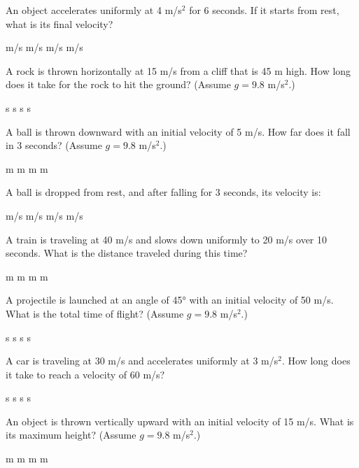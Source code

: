 \documentclass[addpoints]{exam}
\begin{document}
\begin{questions}
\question[1] An object accelerates uniformly at 4 m/s$^2$ for 6 seconds. If it starts from rest, what is its final velocity?
\begin{choices}
     m/s
     m/s
     m/s
     m/s
\end{choices}

\question[1] A rock is thrown horizontally at 15 m/s from a cliff that is 45 m high. How long does it take for the rock to hit the ground? (Assume $g = 9.8$ m/s$^2$.)
\begin{choices}
     s
     s
     s
     s
\end{choices}

\question[1] A ball is thrown downward with an initial velocity of 5 m/s. How far does it fall in 3 seconds? (Assume $g = 9.8$ m/s$^2$.)
\begin{choices}
     m
     m
     m
     m
\end{choices}

\question[1] A ball is dropped from rest, and after falling for 3 seconds, its velocity is:
\begin{choices}
 m/s
 m/s
 m/s
 m/s
\end{choices}

\question[1] A train is traveling at 40 m/s and slows down uniformly to 20 m/s over 10 seconds. What is the distance traveled during this time?
\begin{choices}
 m
 m
 m
 m
\end{choices}

\question[1] A projectile is launched at an angle of 45° with an initial velocity of 50 m/s. What is the total time of flight? (Assume $g = 9.8$ m/s$^2$.)
\begin{choices}
 s
 s
 s
 s
\end{choices}

\question[1] A car is traveling at 30 m/s and accelerates uniformly at 3 m/s$^2$. How long does it take to reach a velocity of 60 m/s?
\begin{choices}
 s
 s
 s
 s
\end{choices}

\question[1] An object is thrown vertically upward with an initial velocity of 15 m/s. What is its maximum height? (Assume $g = 9.8$ m/s$^2$.)
\begin{choices}
 m
 m
 m
 m
\end{choices}



\end{questions}
\end{document}
